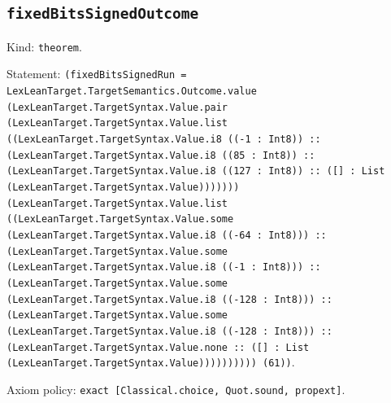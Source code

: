 \documentclass[11pt]{article}
\begin{document}
\subsection*{\texttt{fixedBitsSignedOutcome}}
\noindent Kind: \texttt{theorem}.\par
\noindent Statement: \texttt{(fixedBitsSignedRun = LexLeanTarget.TargetSemantics.Outcome.value (LexLeanTarget.TargetSyntax.Value.pair (LexLeanTarget.TargetSyntax.Value.list ((LexLeanTarget.TargetSyntax.Value.i8 ((-1 : Int8)) :: (LexLeanTarget.TargetSyntax.Value.i8 ((85 : Int8)) :: (LexLeanTarget.TargetSyntax.Value.i8 ((127 : Int8)) :: ([] : List (LexLeanTarget.TargetSyntax.Value))))))) (LexLeanTarget.TargetSyntax.Value.list ((LexLeanTarget.TargetSyntax.Value.some (LexLeanTarget.TargetSyntax.Value.i8 ((-64 : Int8))) :: (LexLeanTarget.TargetSyntax.Value.some (LexLeanTarget.TargetSyntax.Value.i8 ((-1 : Int8))) :: (LexLeanTarget.TargetSyntax.Value.some (LexLeanTarget.TargetSyntax.Value.i8 ((-128 : Int8))) :: (LexLeanTarget.TargetSyntax.Value.some (LexLeanTarget.TargetSyntax.Value.i8 ((-128 : Int8))) :: (LexLeanTarget.TargetSyntax.Value.none :: ([] : List (LexLeanTarget.TargetSyntax.Value)))))))))) (61))}.\par
\noindent Axiom policy: \texttt{exact [Classical.choice, Quot.sound, propext]}.\par
\end{document}

